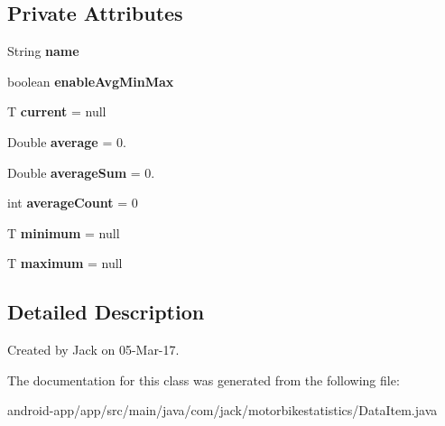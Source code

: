 \subsection*{Private Attributes}
\begin{DoxyCompactItemize}
\item 
\mbox{\label{classcom_1_1jack_1_1motorbikestatistics_1_1_data_item_a09f8b80430dc1620acbe3532d900fc5a}} 
String {\bfseries name}
\item 
\mbox{\label{classcom_1_1jack_1_1motorbikestatistics_1_1_data_item_a7cfeefe9064017755f8462421693d2a9}} 
boolean {\bfseries enable\+Avg\+Min\+Max}
\item 
\mbox{\label{classcom_1_1jack_1_1motorbikestatistics_1_1_data_item_a48cf1c273c44e2181a99d56c48868d1d}} 
T {\bfseries current} = null
\item 
\mbox{\label{classcom_1_1jack_1_1motorbikestatistics_1_1_data_item_a720fe4f7fa02578cc8e0a59ef784746d}} 
Double {\bfseries average} = 0.
\item 
\mbox{\label{classcom_1_1jack_1_1motorbikestatistics_1_1_data_item_ab1d6f0c800def7c32486e31e8195349e}} 
Double {\bfseries average\+Sum} = 0.
\item 
\mbox{\label{classcom_1_1jack_1_1motorbikestatistics_1_1_data_item_aaa50027610a16f6a373f0cd3f5a96333}} 
int {\bfseries average\+Count} = 0
\item 
\mbox{\label{classcom_1_1jack_1_1motorbikestatistics_1_1_data_item_a770342aaa7248e9687517864d73f0009}} 
T {\bfseries minimum} = null
\item 
\mbox{\label{classcom_1_1jack_1_1motorbikestatistics_1_1_data_item_ac1edb9c63224cebf789b7a2ffd45598f}} 
T {\bfseries maximum} = null
\end{DoxyCompactItemize}


\subsection{Detailed Description}
Created by Jack on 05-\/\+Mar-\/17. 

The documentation for this class was generated from the following file\+:\begin{DoxyCompactItemize}
\item 
android-\/app/app/src/main/java/com/jack/motorbikestatistics/Data\+Item.\+java\end{DoxyCompactItemize}
